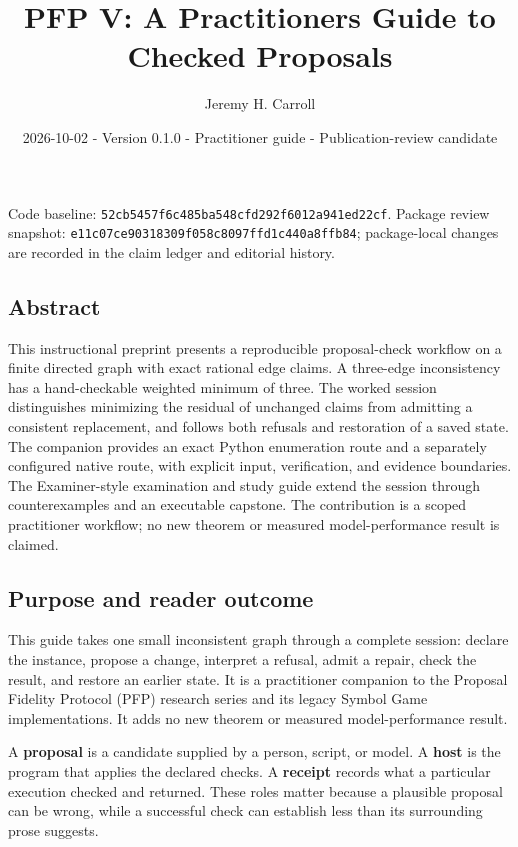 \documentclass[
  11pt,
]{article}
\title{PFP V: A Practitioner\textquotesingle s Guide to Checked
Proposals}
\author{Jeremy H. Carroll}
\date{2026-10-02 - Version 0.1.0 - Practitioner guide -
Publication-review candidate}
\begin{document}
\maketitle

Code baseline: \texttt{52cb5457f6c485ba548cfd292f6012a941ed22cf}.
Package review snapshot:
\texttt{e11c07ce90318309f058c8097ffd1c440a8ffb84}; package-local changes
are recorded in the claim ledger and editorial history.

\hypertarget{abstract}{%
\subsection{Abstract}\label{abstract}}

This instructional preprint presents a reproducible proposal-check
workflow on a finite directed graph with exact rational edge claims. A
three-edge inconsistency has a hand-checkable weighted minimum of three.
The worked session distinguishes minimizing the residual of unchanged
claims from admitting a consistent replacement, and follows both
refusals and restoration of a saved state. The companion provides an
exact Python enumeration route and a separately configured native route,
with explicit input, verification, and evidence boundaries. The
Examiner-style examination and study guide extend the session through
counterexamples and an executable capstone. The contribution is a scoped
practitioner workflow; no new theorem or measured model-performance
result is claimed.

\hypertarget{purpose-and-reader-outcome}{%
\subsection{Purpose and reader
outcome}\label{purpose-and-reader-outcome}}

This guide takes one small inconsistent graph through a complete
session: declare the instance, propose a change, interpret a refusal,
admit a repair, check the result, and restore an earlier state. It is a
practitioner companion to the Proposal Fidelity Protocol (PFP) research
series and its legacy Symbol Game implementations. It adds no new
theorem or measured model-performance result.

A \textbf{proposal} is a candidate supplied by a person, script, or
model. A \textbf{host} is the program that applies the declared checks.
A \textbf{receipt} records what a particular execution checked and
returned. These roles matter because a plausible proposal can be wrong,
while a successful check can establish less than its surrounding prose
suggests.
\end{document}
